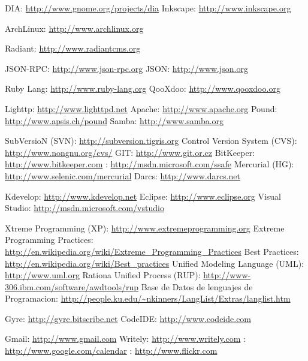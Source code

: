 \begin{thebibliography}{99}

 DIA: \url{http://www.gnome.org/projects/dia}
 Inkscape: \url{http://www.inkscape.org}

 ArchLinux: \url{http://www.archlinux.org}

 Radiant: \url{http://www.radiantcms.org}

 JSON-RPC: \url{http://www.json-rpc.org}
 JSON: \url{http://www.json.org}

 Ruby Lang: \url{http://www.ruby-lang.org}
 QooXdoo: \url{http://www.qooxdoo.org}

 Lighttp: \url{http://www.lighttpd.net}
 Apache: \url{http://www.apache.org}
 Pound: \url{http://www.apsis.ch/pound}
 Samba: \url{http://www.samba.org}

 SubVersioN (SVN): \url{http://subversion.tigris.org}
 Control Version System (CVS): \url{http://www.nongnu.org/cvs/}
 GIT: \url{http://www.git.or.cz}
 BitKeeper: \url{http://www.bitkeeper.com}
 : \url{http://msdn.microsoft.com/ssafe}
 Mercurial (HG): \url{http://www.selenic.com/mercurial}
 Darcs: \url{http://www.darcs.net}

 Kdevelop: \url{http://www.kdevelop.net}
 Eclipse: \url{http://www.eclipse.org}
 Visual Studio: \url{http://msdn.microsoft.com/vstudio}

 Xtreme Programming (XP): \url{http://www.extremeprogramming.org}
 Extreme Programming Practices:
	\url{http://en.wikipedia.org/wiki/Extreme_Programming_Practices}
 Best Practices: \url{http://en.wikipedia.org/wiki/Best_practices}
 Unified Modeling Language (UML): \url{http://www.uml.org}
 Rationa Unified Process (RUP): \url{http://www-306.ibm.com/software/awdtools/rup}
 Base de Datos de lenguajes de Programacion:
	\url{http://people.ku.edu/~nkinners/LangList/Extras/langlist.htm}

 Gyre: \url{http://gyre.bitscribe.net}
 CodeIDE: \url{http://www.codeide.com}

 Gmail: \url{http://www.gmail.com}
 Writely: \url{http://www.writely.com}
 : \url{http://www.google.com/calendar}
 : \url{http://www.flickr.com}

\end{thebibliography}
